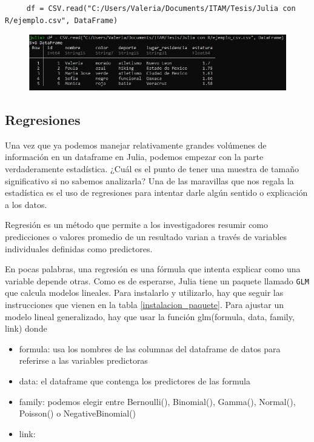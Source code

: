 \begin{verbatim}
     df = CSV.read("C:/Users/Valeria/Documents/ITAM/Tesis/Julia con R/ejemplo.csv", DataFrame)
\end{verbatim}

\begin{figure}[h]
\begin{center}
\includegraphics[scale=0.6]{Imagenes/insertar_df.JPG}
  \label{insertar_df}
\end{center}
\end{figure}





\subsection{Regresiones}

Una vez que ya podemos manejar relativamente grandes volúmenes de información en un dataframe en Julia, podemos empezar con la parte verdaderamente estadística. ¿Cuál es el punto de tener una muestra de tamaño significativo si no sabemos analizarla? Una de las maravillas que nos regala la estadística es el uso de regresiones para intentar darle algún sentido o explicación a los datos. 


Regresión es un método que permite a los investigadores resumir como predicciones o valores promedio de un resultado varian a través de variables individuales definidas como predictores. \citep{regression_other_stories} 

En pocas palabras, una regresión es una fórmula que intenta explicar como una variable depende otras. Como es de esperarse, Julia tiene un paquete llamado \texttt{GLM} que calcula modelos lineales. Para instalarlo y utilizarlo, hay que seguir las instrucciones que vienen en la tabla \ref{instalacion_paquete}. Para ajustar un modelo lineal generalizado, hay que usar la función glm(formula, data, family, link) donde 

\begin{itemize}
    \item formula: usa los nombres de las columnas del dataframe de datos para referirse a las variables predictoras
    \item data: el dataframe que contenga los predictores de las formula
    \item family: podemos elegir entre Bernoulli(), Binomial(), Gamma(), Normal(), Poisson() o NegativeBinomial() 
    \item link: 
\end{itemize}

